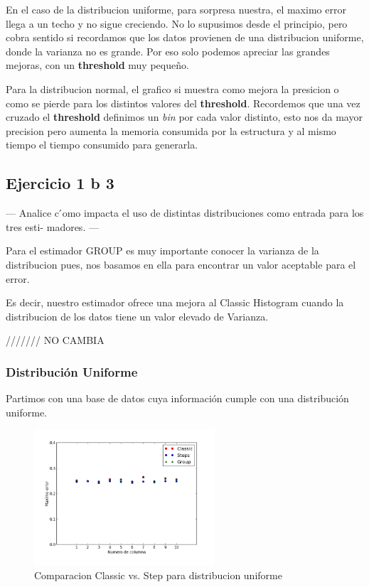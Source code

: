 \documentclass[10pt, a4paper,english,spanish,hidelinks]{article}
\begin{document}
En el caso de la distribucion uniforme, para sorpresa nuestra, el maximo error llega a un
techo y no sigue creciendo. No lo supusimos desde el principio, pero cobra sentido si
recordamos que los datos provienen de una distribucion uniforme, donde la varianza no es
grande. Por eso solo podemos apreciar las grandes mejoras, con un \textbf{threshold} muy pequeño.

Para la distribucion normal, el grafico si muestra como mejora la presicion o como se pierde
para los distintos valores del \textbf{threshold}. Recordemos que una vez cruzado el
\textbf{threshold} definimos un \textit{bin} por cada valor distinto, esto nos da mayor
precision pero aumenta la memoria consumida por la estructura y al mismo tiempo el tiempo
consumido para generarla.



\subsection{Ejercicio 1 b 3}

--- Analice c ́omo impacta el uso de distintas distribuciones como entrada para los tres esti- madores. ---


Para el estimador GROUP es muy importante conocer la varianza de la distribucion pues, nos
basamos en ella para encontrar un valor aceptable para el error.

Es decir, nuestro estimador ofrece una mejora al Classic Histogram cuando la distribucion
de los datos tiene un valor elevado de Varianza.






/////// NO CAMBIA



\subsubsection{Distribución Uniforme}

Partimos con una base de datos cuya información cumple con una distribución uniforme.

\begin{figure}[h!]
  \centering
  \includegraphics[width=0.6\textwidth]{./imagenes/ejb3_uniforme.png}
  \caption{Comparacion Classic vs. Step para distribucion uniforme}
\end{figure}
\end{document}
